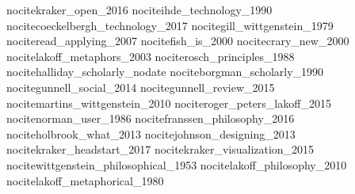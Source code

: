 nocite{kraker_open_2016}
nocite{ihde_technology_1990}
nocite{coeckelbergh_technology_2017}
nocite{gill_wittgenstein_1979}
nocite{read_applying_2007}
nocite{fish_is_2000}
nocite{crary_new_2000}
nocite{lakoff_metaphors_2003}
nocite{rosch_principles_1988}
nocite{halliday_scholarly_nodate}
nocite{borgman_scholarly_1990}
nocite{gunnell_social_2014}
nocite{gunnell_review_2015}
nocite{martins_wittgenstein_2010}
nocite{roger_peters_lakoff_2015}
nocite{norman_user_1986}
nocite{franssen_philosophy_2016}
nocite{holbrook_what_2013}
nocite{johnson_designing_2013}
nocite{kraker_headstart_2017}
nocite{kraker_visualization_2015}
nocite{wittgenstein_philosophical_1953}
nocite{lakoff_philosophy_2010}
nocite{lakoff_metaphorical_1980}